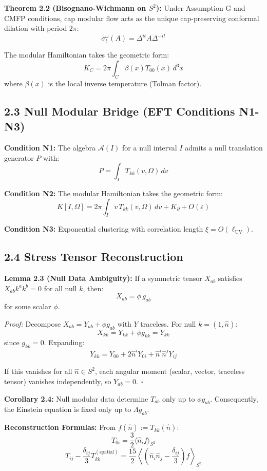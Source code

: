 \textbf{Theorem 2.2 (Bisognano-Wichmann on \(S^2\)):} Under Assumption G and CMFP conditions, cap modular flow acts as the unique cap-preserving conformal dilation with period \(2\pi\): \[\sigma_t^\omega(A) = \Delta^{it} A \Delta^{-it}\]

The modular Hamiltonian takes the geometric form: \[K_C = 2\pi \int_C \beta(x) T_{00}(x) \, d^3x\] where \(\beta(x)\) is the local inverse temperature (Tolman factor).

\subsection{2.3 Null Modular Bridge (EFT Conditions N1-N3)}\label{23-null-modular-bridge-eft-conditions-n1-n3}

\textbf{Condition N1:} The algebra \(\mathcal{A}(I)\) for a null interval \(I\) admits a null translation generator \(P\) with: \[P = \int_I T_{kk}(v, \Omega) \, dv\]

\textbf{Condition N2:} The modular Hamiltonian takes the geometric form: \[K[I, \Omega] = 2\pi \int_I v \, T_{kk}(v, \Omega) \, dv + K_\partial + O(\varepsilon)\]

\textbf{Condition N3:} Exponential clustering with correlation length \(\xi = O(\ell_{\text{UV}})\).

\subsection{2.4 Stress Tensor Reconstruction}\label{24-stress-tensor-reconstruction}

\textbf{Lemma 2.3 (Null Data Ambiguity):} If a symmetric tensor \(X_{ab}\) satisfies \(X_{ab}k^a k^b = 0\) for all null \(k\), then: \[X_{ab} = \phi \, g_{ab}\] for some scalar \(\phi\).

\emph{Proof:} Decompose \(X_{ab} = Y_{ab} + \phi g_{ab}\) with \(Y\) traceless. For null \(k = (1, \hat{n})\): \[X_{kk} = Y_{kk} + \phi g_{kk} = Y_{kk}\] since \(g_{kk} = 0\). Expanding: \[Y_{kk} = Y_{00} + 2\hat{n}^i Y_{0i} + \hat{n}^i \hat{n}^j Y_{ij}\]

If this vanishes for all \(\hat{n} \in S^2\), each angular moment (scalar, vector, traceless tensor) vanishes independently, so \(Y_{ab} = 0\). \(\square\)

\textbf{Corollary 2.4:} Null modular data determine \(T_{ab}\) only up to \(\phi g_{ab}\). Consequently, the Einstein equation is fixed only up to \(\Lambda g_{ab}\).

\textbf{Reconstruction Formulas:} From \(f(\hat{n}) := T_{kk}(\hat{n})\): \[T_{0i} = \frac{3}{2}\langle \hat{n}_i f \rangle_{S^2}\] \[T_{ij} - \frac{\delta_{ij}}{3}T^{(\text{spatial})}_{kk} = \frac{15}{2}\left\langle \left(\hat{n}_i \hat{n}_j - \frac{\delta_{ij}}{3}\right) f \right\rangle_{S^2}\]


